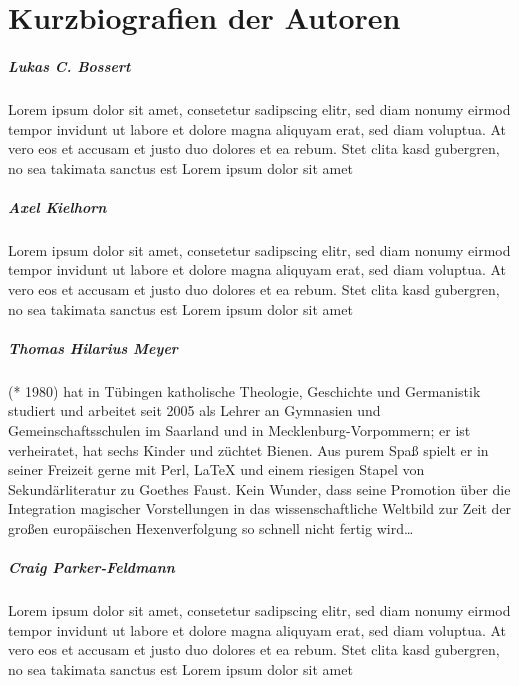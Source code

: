 \chapter{Kurzbiografien der Autoren}


\paragraph{Lukas C. Bossert} Lorem ipsum dolor sit amet, consetetur sadipscing elitr, sed diam nonumy eirmod tempor invidunt ut labore et dolore magna aliquyam erat, sed diam voluptua. At vero eos et accusam et justo duo dolores et ea rebum. Stet clita kasd gubergren, no sea takimata sanctus est Lorem ipsum dolor sit amet

\paragraph{Axel Kielhorn} Lorem ipsum dolor sit amet, consetetur sadipscing elitr, sed diam nonumy eirmod tempor invidunt ut labore et dolore magna aliquyam erat, sed diam voluptua. At vero eos et accusam et justo duo dolores et ea rebum. Stet clita kasd gubergren, no sea takimata sanctus est Lorem ipsum dolor sit amet

\paragraph{Thomas Hilarius Meyer} (* 1980) hat in Tübingen katholische Theologie, Geschichte und Germanistik studiert und arbeitet
seit 2005 als Lehrer an Gymnasien und Gemeinschaftsschulen im Saarland und in Mecklenburg-Vorpommern;
er ist verheiratet, hat sechs Kinder und züchtet Bienen.
Aus purem Spaß spielt er in seiner Freizeit gerne mit Perl, \LaTeX{} und einem riesigen Stapel von Sekundärliteratur zu
Goethes Faust. Kein Wunder, dass seine Promotion über die Integration magischer Vorstellungen in das wissenschaftliche Weltbild
zur Zeit der großen europäischen Hexenverfolgung so schnell nicht fertig wird\ldots

\paragraph{Craig Parker-Feldmann} Lorem ipsum dolor sit amet, consetetur sadipscing elitr, sed diam nonumy eirmod tempor invidunt ut labore et dolore magna aliquyam erat, sed diam voluptua. At vero eos et accusam et justo duo dolores et ea rebum. Stet clita kasd gubergren, no sea takimata sanctus est Lorem ipsum dolor sit amet

